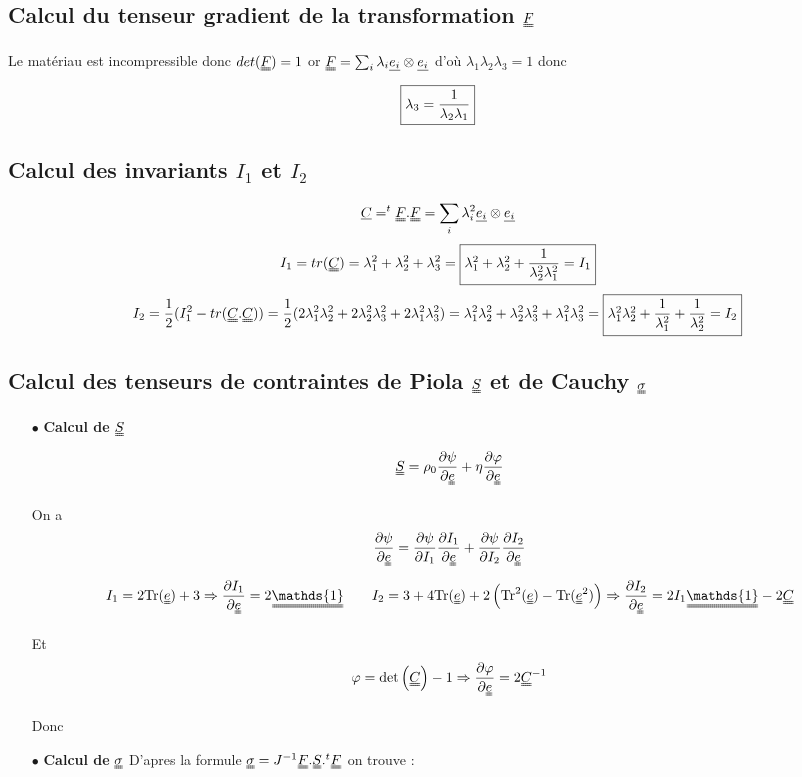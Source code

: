 \documentclass[a4paper,11pt]{article}
\begin{document}
\subsection{Calcul du tenseur gradient de la transformation $\uuline{F}$}
Le matériau est incompressible donc $det(\uuline{F})=1$ or $\uuline{F}=\sum_{i} \lambda_i \uline{e_i}\otimes \uline{e_i}$ d'où $\lambda_1\lambda_2\lambda_3=1$ donc $$\fbox{$\lambda_3=\dfrac{1}{\lambda_2\lambda_1} $}$$

\subsection{Calcul des invariants $I_1$ et $I_2$}
$$\uline{C}=^t\uuline{F}.\uuline{F}=\sum_{i} \lambda_i ^2\uline{e_i}\otimes \uline{e_i}$$
$$I_1= tr(\uuline{C})=\lambda_1^2+\lambda_2^2+\lambda_3^2=\fbox{$\lambda_1^2+\lambda_2^2+\dfrac{1}{\lambda_2^2\lambda_1^2}=I_1$}$$
$$I_2=\frac{1}{2}(I_1^2 - tr(\uuline{C}.\uuline{C})) =\frac{1}{2}(2\lambda_1^2\lambda_2^2+2\lambda_2^2\lambda_3^2+2\lambda_1^2\lambda_3^2) =\lambda_1^2\lambda_2^2+\lambda_2^2\lambda_3^2+\lambda_1^2\lambda_3^2 =\fbox{$\lambda_1^2\lambda_2^2+\dfrac{1}{\lambda_1^2}+\dfrac{1}{\lambda_2^2}=I_2$}$$

\subsection{Calcul des tenseurs de contraintes de Piola $\uuline{S}$ et de Cauchy $\uuline{\sigma}$}
\begin{itemize}
	\item[$\bullet$ \textbf{Calcul de} $\uuline{S}$] $$ \uuline{S} = \rho_0 \frac{\partial \psi}{\partial \uuline{e}} + \eta\frac{\partial \varphi}{\partial \uuline{e}} $$

	On a $$\frac{\partial \psi}{\partial \uuline{e}}= \frac{\partial \psi}{\partial I_1}\frac{\partial I_1}{\partial \uuline{e}}+\frac{\partial \psi}{\partial I_2}\frac{\partial I_2}{\partial \uuline{e}}$$
 $$I_1=2\text{Tr}(\uuline{e})+3\Rightarrow \frac{\partial I_1}{\partial \uuline{e}}= 2\uuline{\mathds{1}} \quad \quad I_2=3+4\text{Tr}(\uuline{e})+2\left(\text{Tr}^2(\uuline{e})-\text{Tr}(\uuline{e}^2)\right)
 \Rightarrow \frac{\partial I_2}{\partial \uuline{e}}= 2 I_1\uuline{\mathds{1}}-2\uuline{C}   $$

Et $$\varphi=\text{det}\left(\uuline{C}\right)-1 \Rightarrow  \frac{\partial \varphi}{\partial \uuline{e}}= 2\uuline{C}^{-1}$$

Donc 
	\item[$\bullet$ \textbf{Calcul de} $\uuline{\sigma}$] D'apres la formule $\uuline{\sigma}=J^{-1}\uuline{F}.\uuline{S}.{}^t\uuline{F} $ on trouve :
	\\
\end{itemize}
\end{document}
